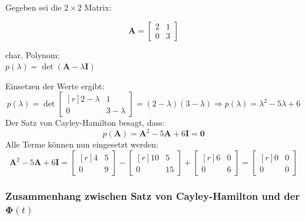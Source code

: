 Gegeben sei die \(2 \times 2\) Matrix:
\begin{center}
\begin{minipage}[t]{0.48\columnwidth}
    \vspace{-0.05cm}
    $$\bm{A} = \begin{bmatrix*} 2 & 1 \\ 0 & 3 \end{bmatrix*}$$
\end{minipage}
\hfill
\begin{minipage}[t]{0.48\columnwidth}
    \vspace{0cm}
    char. Polynom: \\
    \(p(\lambda) = \det(\bm{A} - \lambda \bm{I})\)
\end{minipage}
\end{center}
Einsetzen der Werte ergibt:
$$ p(\lambda) = \det\begin{bmatrix*}[r] 2 - \lambda & 1 \\ 0 & 3 - \lambda \end{bmatrix*} = (2 - \lambda)(3 - \lambda)
\Rightarrow p(\lambda) = \lambda^2 - 5\lambda + 6 $$
Der Satz von Cayley-Hamilton besagt, dass:
$$ p(\bm{A}) = \bm{A}^2 - 5\bm{A} + 6\bm{I} = \bm{0} $$
Alle Terme können nun eingesetzt werden:
$$ \bm{A}^2 - 5\bm{A} + 6\bm{I} =  \begin{bmatrix*}[r] 4 & 5 \\ 0 & 9 \end{bmatrix*} - \begin{bmatrix*}[r] 10 & 5 \\ 0 & 15 \end{bmatrix*} 
+ \begin{bmatrix*}[r] 6 & 0 \\ 0 & 6 \end{bmatrix*} = \begin{bmatrix*}[r] 0 & 0 \\ 0 & 0 \end{bmatrix*} $$

\subsubsection*{Zusammenhang zwischen Satz von Cayley-Hamilton und der $\bm{\Phi}(t)$}

